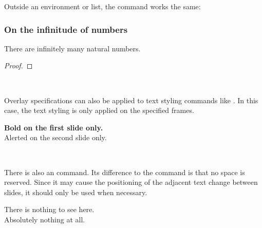 Outside an environment or list, the  command works the same:
%
\begin{ExampleCode}
\begin{frame}
\frametitle{On the infinitude of numbers}

\begin{corollary}
There are infinitely many natural numbers.
\end{corollary}
\begin{proof}
\end{proof}

\end{frame}
\end{ExampleCode}
%
\begin{center}
~
~
\end{center}

Overlay specifications can also be applied to text styling commands like .
In this case, the text styling is only applied on the specified frames.
%
\begin{ExampleCode}
\begin{frame}

\textbf<1>{Bold on the first slide only.}\\
\alert<2>{Alerted on the second slide only.}

\end{frame}
\end{ExampleCode}
%
\begin{center}
~
\end{center}


There is also an  command.
Its difference to the  command is that no space is reserved.
Since it may cause the positioning of the adjacent text change
between slides, it should only be used when necessary.
%
\begin{ExampleCode}
\begin{frame}

There is nothing to see here.\\
Absolutely nothing at all.

\end{frame}
\end{ExampleCode}
%
\begin{center}
~
\end{center}

